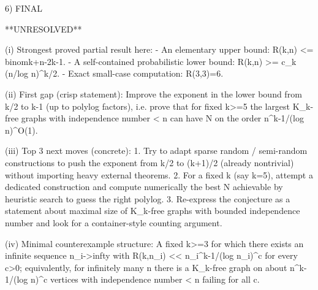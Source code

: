 6) FINAL

**UNRESOLVED**

(i) Strongest proved partial result here:
    - An elementary upper bound: R(k,n) <= binom{k+n-2}{k-1}.
    - A self-contained probabilistic lower bound: R(k,n) >= c_k (n/log n)^{k/2}.
    - Exact small-case computation: R(3,3)=6.

(ii) First gap (crisp statement):
    Improve the exponent in the lower bound from k/2 to k-1 (up to polylog factors),
    i.e. prove that for fixed k>=5 the largest K_k-free graphs with independence number < n
    can have N on the order n^{k-1}/(log n)^{O(1)}.

(iii) Top 3 next moves (concrete):
    1. Try to adapt sparse random / semi-random constructions to push the exponent from k/2
       to (k+1)/2 (already nontrivial) without importing heavy external theorems.
    2. For a fixed k (say k=5), attempt a dedicated construction and compute numerically the
       best N achievable by heuristic search to guess the right polylog.
    3. Re-express the conjecture as a statement about maximal size of K_k-free graphs with
       bounded independence number and look for a container-style counting argument.

(iv) Minimal counterexample structure:
    A fixed k>=3 for which there exists an infinite sequence n_i->infty with
      R(k,n_i) << n_i^{k-1}/(log n_i)^{c}
    for every c>0; equivalently, for infinitely many n there is a K_k-free graph on about
    n^{k-1}/(log n)^{c} vertices with independence number < n failing for all c.

